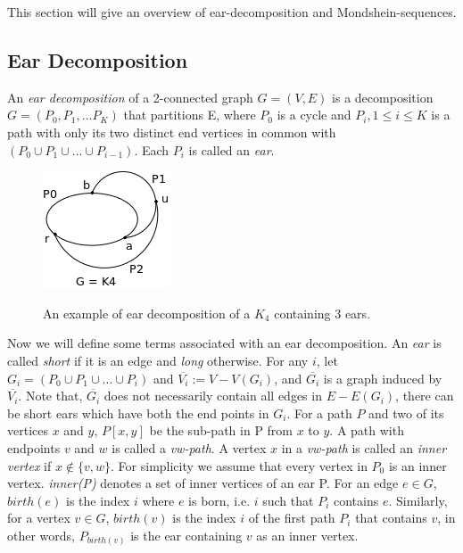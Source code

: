 This section will give an overview of ear-decomposition and Mondshein-sequences.
\subsection{Ear Decomposition}
\begin{defn}\label{def:eardecomp}
An \textit{ear decomposition} of a 2-connected graph $G=(V,E)$ is a decomposition $G = (P_0, P_1,... P_K)$ that partitions E,
where $P_0$  is a cycle and $P_i, 1 \leq i \leq K$ is a path with only its two distinct end vertices in common with $(P_0 \cup P_1 \cup ... \cup P_{i-1})$. 
Each $P_i$ is called an \textit{ear}.
\end{defn}

\begin{figure}
    \centering
    \includegraphics[scale=0.6]{earDecomp.png} \\
    \caption{An example of ear decomposition of a $K_4$ containing 3 ears.}
    \label{fig:earDecomp}
\end{figure}

Now we will define some terms associated with an ear decomposition.
An \textit{ear} is called \textit{short} if it is an edge and \textit{long} otherwise.
For any $i$, let $G_i = (P_0 \cup P_1 \cup ... \cup P_{i})$ and $\overline{V_i} := V - V(G_i)$, and $\overline{G_i}$ is a graph induced by $\overline{V_i}$.
Note that, $\overline{G_i}$ does not necessarily contain all edges in $E - E(G_i)$, there can be short ears which have both the end points in $G_i$.
For a path $P$ and two of its vertices $x$ and $y$, $P[x,y]$ be the sub-path in P from $x$ to $y$.
A path with endpoints $v$ and $w$ is called a \textit{vw-path}.
A vertex $x$ in a \textit{vw-path} is called an \textit{inner vertex} if $x \notin \{v,w\}$.
For simplicity we assume that every vertex in $P_0$ is an inner vertex.
\textit{inner(P)} denotes a set of inner vertices of an ear P.
For an edge $e \in G$, $birth(e)$ is the index $i$ where $e$ is born, i.e. $i$ such that $P_i$ contains $e$.
Similarly, for a vertex $v \in G$, $birth(v)$ is the index $i$ of the first path $P_i$ that contains $v$, 
in other words, $P_{birth(v)}$ is the ear containing $v$ as an inner vertex.

